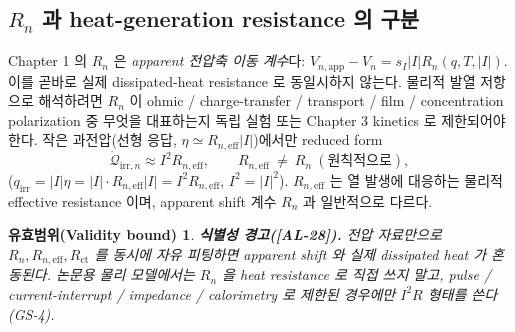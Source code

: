 \documentclass[11pt,a4paper]{article}
\newtheorem*{boundbox}{유효범위(Validity bound)}
\newcommand{\eff}{\mathrm{eff}}
\newcommand{\app}{\mathrm{app}}
\newcommand{\irr}{\mathrm{irr}}
\newcommand{\AL}[1]{\textsf{[AL-#1]}}
\begin{document}
\subsection{$R_n$ 과 heat-generation resistance 의 구분 }\label{sec:ch2_Rn}
Chapter 1 의 $R_n$ 은 \emph{apparent 전압축 이동 계수}다: $V_{n,\app}-V_n=s_I|I|R_n(q,T,|I|)$. 이를 곧바로
실제 dissipated-heat resistance 로 동일시하지 않는다. 물리적 발열 저항으로 해석하려면 $R_n$ 이 ohmic /
charge-transfer / transport / film / concentration polarization 중 무엇을 대표하는지 독립 실험 또는 Chapter 3
kinetics 로 제한되어야 한다. 작은 과전압(선형 응답, $\eta\simeq R_{n,\eff}|I|$)에서만 reduced form
\begin{equation}
\dot{\mathcal Q}_{\irr,n}\approx I^2R_{n,\eff},\qquad R_{n,\eff}\ \ne\ R_n\ (\text{원칙적으로}),
\label{eq:ch2_i2r}
\end{equation}
($q_\irr=|I|\eta=|I|\cdot R_{n,\eff}|I|=I^2 R_{n,\eff}$, $I^2=|I|^2$). $R_{n,\eff}$ 는 열 발생에 대응하는
물리적 effective resistance 이며, apparent shift 계수 $R_n$ 과 일반적으로 다르다.
\begin{boundbox}
\textbf{식별성 경고(\AL{28}).} 전압 자료만으로 $R_n,R_{n,\eff},R_{\mathrm{ct}}$ 를 동시에 자유 피팅하면
apparent shift 와 실제 dissipated heat 가 혼동된다. 논문용 물리 모델에서는 $R_n$ 을 heat resistance 로 직접
쓰지 말고, pulse / current-interrupt / impedance / calorimetry 로 제한된 경우에만 $I^2R$ 형태를 쓴다(GS-4).
\end{boundbox}

\end{document}
